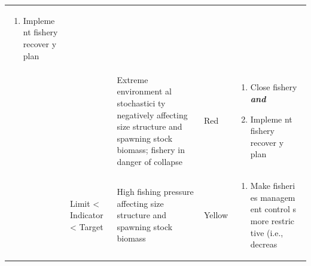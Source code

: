 \documentclass[]{book}
\providecommand{\tightlist}{%
  \setlength{\itemsep}{0pt}\setlength{\parskip}{0pt}}
\begin{document}
\begin{longtable}[]{@{}lllll@{}}
\begin{minipage}[t]{0.19\columnwidth}
\begin{enumerate}
\def\labelenumi{\arabic{enumi}.}
\tightlist
\item
  Impleme nt fishery recover y plan
\end{enumerate}\strut
\end{minipage}\tabularnewline
\begin{minipage}[t]{0.19\columnwidth}\raggedright\strut
\strut
\end{minipage} & \begin{minipage}[t]{0.19\columnwidth}\raggedright\strut
\strut
\end{minipage} & \begin{minipage}[t]{0.19\columnwidth}\raggedright\strut
Extreme environment al stochastici ty negatively affecting size
structure and spawning stock biomass; fishery in danger of
collapse\strut
\end{minipage} & \begin{minipage}[t]{0.19\columnwidth}\raggedright\strut
Red\strut
\end{minipage} & \begin{minipage}[t]{0.19\columnwidth}\raggedright\strut
\begin{enumerate}
\def\labelenumi{\arabic{enumi}.}
\item
  Close fishery \textbf{\emph{and} }
\item
  Impleme nt fishery recover y plan
\end{enumerate}\strut
\end{minipage}\tabularnewline
\begin{minipage}[t]{0.19\columnwidth}\raggedright\strut
\strut
\end{minipage} & \begin{minipage}[t]{0.19\columnwidth}\raggedright\strut
Limit \textless{} Indicator \textless{} Target\strut
\end{minipage} & \begin{minipage}[t]{0.19\columnwidth}\raggedright\strut
High fishing pressure affecting size structure and spawning stock
biomass\strut
\end{minipage} & \begin{minipage}[t]{0.19\columnwidth}\raggedright\strut
Yellow\strut
\end{minipage} & \begin{minipage}[t]{0.19\columnwidth}\raggedright\strut
\begin{enumerate}
\def\labelenumi{\arabic{enumi}.}
\tightlist
\item
  Make fisheri es managem ent control s more restric tive (i.e., decreas

\end{enumerate}
\end{minipage}
\end{longtable}
\end{document}
